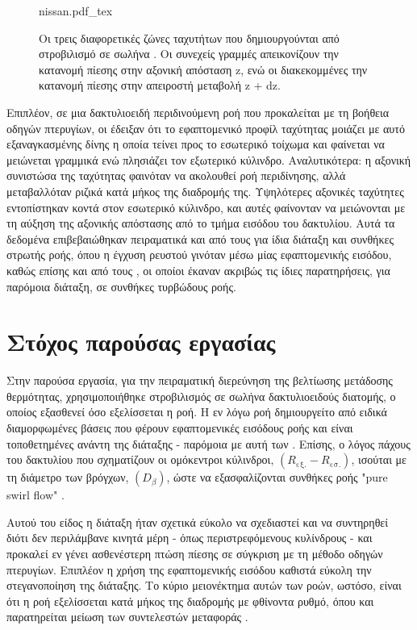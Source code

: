 \begin{figure}[htbp]
\centering
{nissan.pdf_tex}
\caption[Ζώνες πεδίου ταχύτητας περιδινούμενων ροών]{Οι τρεις διαφορετικές ζώνες ταχυτήτων που δημιουργούνται από στροβιλισμό σε σωλήνα \cite{1961_Nissan}. Οι συνεχείς γραμμές απεικονίζουν την κατανομή πίεσης στην αξονική απόσταση z, ενώ οι διακεκομμένες την κατανομή πίεσης στην απειροστή μεταβολή z + dz.}\label{fig:nissan}
\end{figure}

Επιπλέον, σε μια δακτυλιοειδή περιδινούμενη ροή που προκαλείται με τη βοήθεια οδηγών πτερυγίων, οι \citeauthor{1986_Morsi} \cite{1986_Morsi} έδειξαν ότι το εφαπτομενικό προφίλ ταχύτητας μοιάζει με αυτό εξαναγκασμένης δίνης η οποία τείνει προς το εσωτερικό τοίχωμα και φαίνεται να μειώνεται γραμμικά ενώ πλησιάζει τον εξωτερικό κύλινδρο. Αναλυτικότερα: η αξονική συνιστώσα της ταχύτητας φαινόταν να ακολουθεί ροή περιδίνησης, αλλά μεταβαλλόταν ριζικά κατά μήκος της διαδρομής της. Υψηλότερες αξονικές ταχύτητες εντοπίστηκαν κοντά στον εσωτερικό κύλινδρο, και αυτές φαίνονταν να μειώνονται με τη αύξηση της αξονικής απόστασης από το τμήμα εισόδου του δακτυλίου. Αυτά τα δεδομένα επιβεβαιώθηκαν πειραματικά και από τους \citeauthor{1991_Bottaro} \cite{1991_Bottaro} για ίδια διάταξη και συνθήκες στρωτής ροής, όπου η έγχυση ρευστού γινόταν μέσω μίας εφαπτομενικής εισόδου, καθώς επίσης και από τους \citeauthor{1990_Khodadadi} \cite{1990_Khodadadi}, οι οποίοι έκαναν ακριβώς τις ίδιες παρατηρήσεις, για παρόμοια διάταξη, σε συνθήκες τυρβώδους ροής.

\section{Στόχος παρούσας εργασίας}

\noindent Στην παρούσα εργασία, για την πειραματική διερεύνηση της βελτίωσης μετάδοσης θερμότητας, χρησιμοποιήθηκε στροβιλισμός σε σωλήνα δακτυλιοειδούς διατομής, ο οποίος εξασθενεί όσο εξελίσσεται η ροή. Η εν λόγω ροή δημιουργείτο από ειδικά διαμορφωμένες βάσεις που φέρουν εφαπτομενικές εισόδους ροής και είναι τοποθετημένες ανάντη της διάταξης -  παρόμοια με αυτή των \citeauthor{1995_Chang} \cite{1995_Chang}. Επίσης, ο λόγος πάχους του δακτυλίου που σχηματίζουν οι ομόκεντροι κύλινδροι, $\left(R_{\text{εξ.}} - R_{\text{εσ.}}\right)$, ισούται με τη διάμετρο των βρόγχων, $\left(D_{\beta}\right)$, ώστε να εξασφαλίζονται συνθήκες ροής "pure swirl flow" \cite{1991_Legentilhomme}.

Αυτού του είδος η διάταξη ήταν σχετικά εύκολο να σχεδιαστεί και να συντηρηθεί διότι δεν περιλάμβανε κινητά μέρη - όπως περιστρεφόμενους κυλίνδρους - και προκαλεί εν γένει ασθενέστερη πτώση πίεσης σε σύγκριση με τη μέθοδο οδηγών πτερυγίων. Επιπλέον η χρήση της εφαπτομενικής εισόδου καθιστά εύκολη την στεγανοποίηση της διάταξης. Το κύριο μειονέκτημα αυτών των ροών, ωστόσο, είναι ότι η ροή εξελίσσεται κατά μήκος της διαδρομής με φθίνοντα ρυθμό, όπου και παρατηρείται μείωση των συντελεστών μεταφοράς \parencites{1990_Legentilhomme}{1991_Legentilhomme}{1985_Shoukry}.

